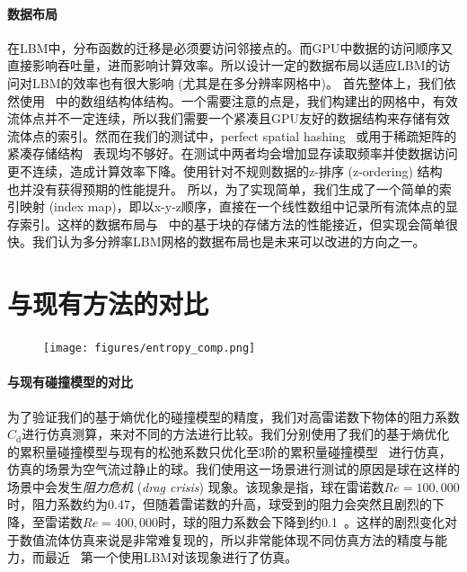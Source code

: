 \paragraph{数据布局}
在LBM中，分布函数的迁移是必须要访问邻接点的。而GPU中数据的访问顺序又直接影响吞吐量，进而影响计算效率。所以设计一定的数据布局以适应LBM的访问对LBM的效率也有很大影响 (尤其是在多分辨率网格中)。
首先整体上，我们依然使用~\cite{Chen-2021} 中的数组结构体结构。一个需要注意的点是，我们构建出的网格中，有效流体点并不一定连续，所以我们需要一个紧凑且GPU友好的数据结构来存储有效流体点的索引。然而在我们的测试中，perfect spatial hashing~\cite{Lefebvre-2006} 或用于稀疏矩阵的紧凑存储结构~\cite{Greathouse-2014} 表现均不够好。在测试中两者均会增加显存读取频率并使数据访问更不连续，造成计算效率下降。使用针对不规则数据的z-排序 (z-ordering) 结构~\cite{Chen-2021} 也并没有获得预期的性能提升。
所以，为了实现简单，我们生成了一个简单的索引映射 (index map)，即以x-y-z顺序，直接在一个线性数组中记录所有流体点的显存索引。这样的数据布局与~\cite{Chen-2021} 中的基于块的存储方法的性能接近，但实现会简单很快。我们认为多分辨率LBM网格的数据布局也是未来可以改进的方向之一。

\section{与现有方法的对比}
\begin{figure}[htb]
  \centering
    \texttt{[image: figures/entropy\_comp.png]}
  \label{img:entropy_comp}
  \end{figure}

\paragraph{与现有碰撞模型的对比}
为了验证我们的基于熵优化的碰撞模型的精度，我们对高雷诺数下物体的阻力系数$C_\text{d}$进行仿真测算，来对不同的方法进行比较。我们分别使用了我们的基于熵优化的累积量碰撞模型与现有的松弛系数只优化至3阶的累积量碰撞模型~\cite{Geier-2017} 进行仿真，仿真的场景为空气流过静止的球。我们使用这一场景进行测试的原因是球在这样的场景中会发生\emph{阻力危机} (\emph{drag crisis}) 现象。该现象是指，球在雷诺数$Re=100,000$时，阻力系数约为0.47，但随着雷诺数的升高，球受到的阻力会突然且剧烈的下降，至雷诺数$Re=400,000$时，球的阻力系数会下降到约0.1~\cite{Tiwari-2020}。这样的剧烈变化对于数值流体仿真来说是非常难复现的，所以非常能体现不同仿真方法的精度与能力，而最近~\cite{Geier-2017-b} 第一个使用LBM对该现象进行了仿真。

